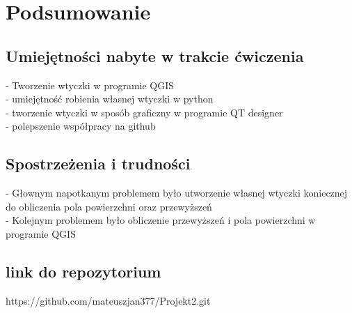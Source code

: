 \section{Podsumowanie}


\subsection{Umiejętności nabyte w trakcie ćwiczenia}
- Tworzenie wtyczki w programie QGIS
\\-	umiejętność robienia własnej wtyczki w python
\\- tworzenie wtyczki w sposób graficzny w programie QT designer 
\\- polepszenie współpracy na github

\subsection{Spostrzeżenia i trudności}
- Głownym napotkanym problemem było utworzenie własnej wtyczki koniecznej do obliczenia pola powierzchni oraz przewyższeń 
\\- Kolejnym problemem było obliczenie przewyższeń i pola powierzchni w programie QGIS 
\subsection{link do repozytorium}
https://github.com/mateuszjan377/Projekt2.git